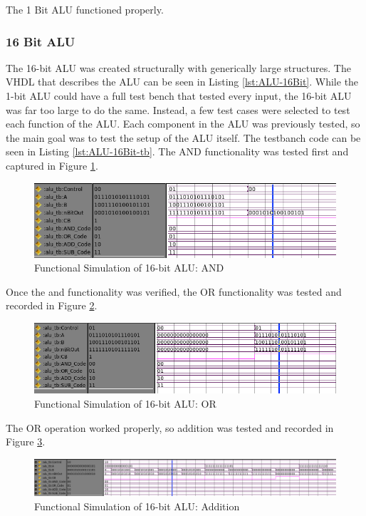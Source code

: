 \documentclass[11pt]{article}
\begin{document}
			The 1 Bit ALU functioned properly.
		
		\subsubsection{16 Bit ALU}
		
			The 16-bit ALU was created structurally with generically large structures. The VHDL that describes the ALU can be seen in Listing \ref{lst:ALU-16Bit}. While the 1-bit ALU could have a full test bench that tested every input, the 16-bit ALU was far too large to do the same. Instead, a few test cases were selected to test each function of the ALU. Each component in the ALU was previously tested, so the main goal was to test the setup of the ALU itself. The testbanch code can be seen in Listing \ref{lst:ALU-16Bit-tb}. The AND functionality was tested first and captured in Figure \ref{fig:16-bit-alu-and}.
		
			\begin{figure}[H]
				\centering
				\includegraphics[width=0.7\linewidth]{"Pictures/16 Bit ALU AND"}
				\caption{Functional Simulation of 16-bit ALU: AND}
				\label{fig:16-bit-alu-and}
			\end{figure}
		
			Once the and functionality was verified, the OR functionality was tested and recorded in Figure \ref{fig:16-bit-alu-or}.
		
			\begin{figure}[H]
				\centering
				\includegraphics[width=0.7\linewidth]{"Pictures/16 Bit ALU OR"}
				\caption{Functional Simulation of 16-bit ALU: OR}
				\label{fig:16-bit-alu-or}
			\end{figure}
			
			The OR operation worked properly, so addition was tested and recorded in Figure \ref{fig:16-bit-alu-add}.
			
			\begin{figure}[H]
				\centering
				\includegraphics[width=0.7\linewidth]{"Pictures/16 Bit ALU Add"}
				\caption{Functional Simulation of 16-bit ALU: Addition}
				\label{fig:16-bit-alu-add}
			\end{figure}
		
\end{document}
